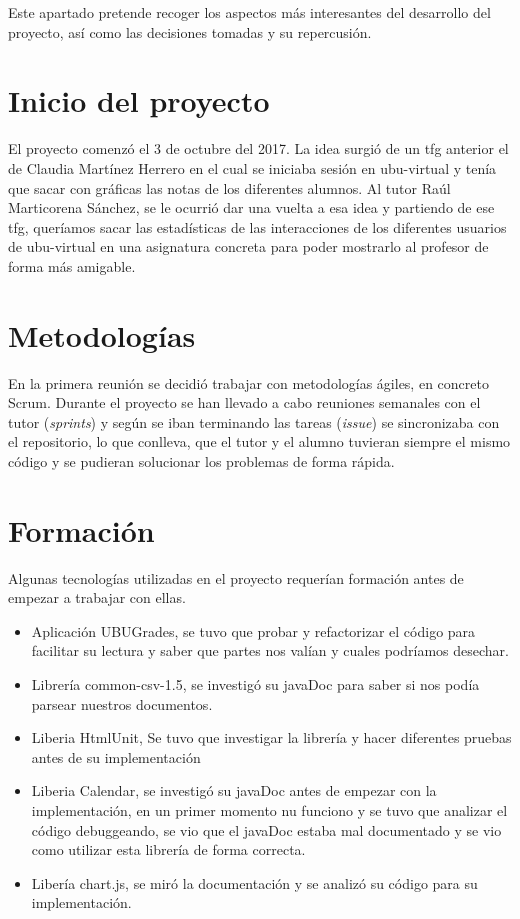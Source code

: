 
Este apartado pretende recoger los aspectos más interesantes del desarrollo del proyecto, así como las decisiones tomadas y su repercusión.

\section{Inicio del proyecto}\label{inicio-del-proyecto}

El proyecto comenzó el 3 de octubre del 2017. La idea surgió de un tfg anterior el de Claudia Martínez Herrero \cite{claudia} en el cual se iniciaba sesión en ubu-virtual y tenía que sacar con gráficas las notas de los diferentes alumnos. Al tutor Raúl Marticorena Sánchez, se le ocurrió dar una vuelta a esa idea y partiendo de ese tfg, queríamos sacar las estadísticas de las interacciones de los diferentes usuarios de ubu-virtual en una asignatura concreta para poder mostrarlo al profesor de forma más amigable.


\section{Metodologías}\label{metodologias-proyecto}

En la primera reunión se decidió trabajar con metodologías ágiles, en concreto Scrum. Durante el proyecto se han llevado a cabo reuniones semanales con el tutor (\emph{sprints}) y según se iban terminando las tareas (\emph{issue}) se sincronizaba con el repositorio, lo que conlleva, que el tutor y el alumno tuvieran siempre el mismo código y se pudieran solucionar los problemas de forma rápida.

\section{Formación}\label{formacion}

Algunas tecnologías utilizadas en el proyecto requerían formación antes de empezar a trabajar con ellas.

\begin{itemize}
	\tightlist
	\item
	Aplicación UBUGrades, se tuvo que probar y refactorizar el código para facilitar su lectura y saber que partes nos valían y cuales podríamos desechar.
	\item
	Librería common-csv-1.5, se investigó su javaDoc para saber si nos podía parsear nuestros documentos.
	\item
	Liberia HtmlUnit, Se tuvo que investigar la librería y hacer diferentes pruebas antes de su implementación
	\item
	Liberia Calendar, se investigó su javaDoc antes de empezar con la implementación, en un primer momento nu funciono y se tuvo que analizar el código debuggeando, se vio que el javaDoc estaba mal documentado y se vio como utilizar esta librería de forma correcta.
	\item
	Libería chart.js, se miró la documentación \cite{javascript:chart} y se analizó su código para su implementación.
\end{itemize}

